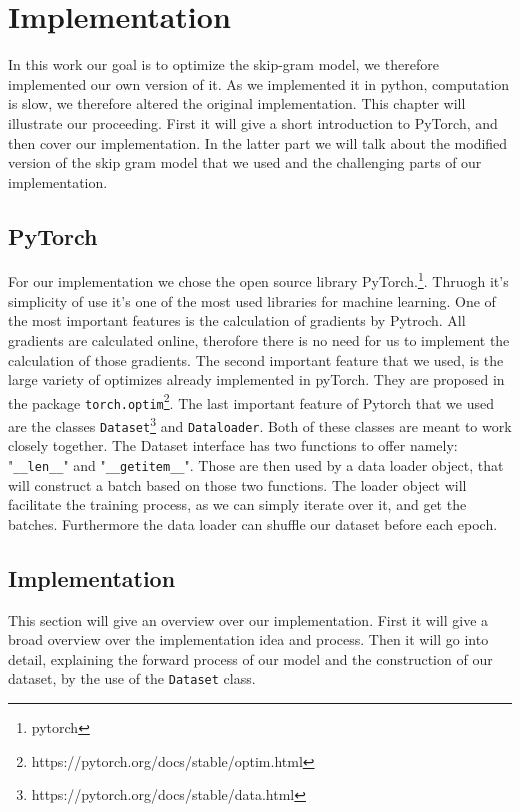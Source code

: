 \chapter{Implementation}\label{chap:impl}

In this work our goal is to optimize the skip-gram model, we therefore implemented our own version of it. As we implemented it in python, computation is slow, we therefore altered the original implementation. 
This chapter will illustrate our proceeding. First it will give a short introduction to PyTorch, and then cover our implementation. In the latter part we will talk about the modified version of the skip gram model that we used and the challenging parts of our implementation.
\section{PyTorch}
For our implementation we chose the open source library PyTorch.\footnote{pytorch}. Thruogh it's simplicity of use it's one of the most used libraries for machine learning. One of the most important features is the calculation of gradients by Pytroch. All gradients are calculated online, therofore there is no need for us to implement the calculation of those gradients. The second important feature that we used, is the large variety of optimizes already implemented in pyTorch. They are proposed in the package \texttt{torch.optim}\footnote{https://pytorch.org/docs/stable/optim.html}. The last important feature of Pytorch that we used are the classes \texttt{Dataset}\footnote{\label{note_data}https://pytorch.org/docs/stable/data.html} and \texttt{Dataloader}\footnotemark[\ref{note_data}]. Both of these classes are meant to work closely together.   The Dataset interface has two functions to offer namely: "\texttt{\_\_len\_\_}" and "\texttt{\_\_getitem\_\_}". Those are then used by a data loader object, that will construct a batch based on those two functions. The loader object will facilitate the training process, as we can simply iterate over it, and get the batches. Furthermore the data loader can shuffle our dataset before each epoch. 
\section{Implementation}
This section will give an overview over our implementation. First it will give a broad overview over the implementation idea and process. Then it will go into detail, explaining the forward process of our model and the construction of our dataset, by the use of the \texttt{Dataset} class. 
